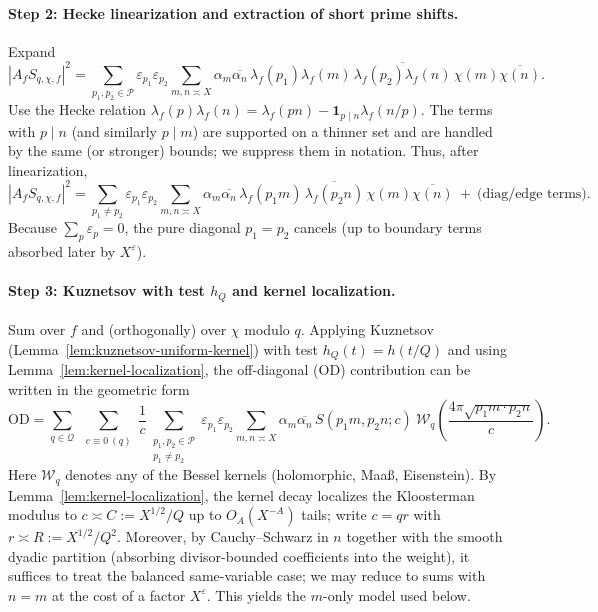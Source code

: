 \documentclass[11pt]{article}
\theoremstyle{definition}
\theoremstyle{remark}
\numberwithin{equation}{part}
\begin{document}
\paragraph{Step 2: Hecke linearization and extraction of short prime shifts.}
Expand
\[
	|A_f S_{q,\chi,f}|^2
	=\sum_{p_1,p_2\in\mathcal P}\varepsilon_{p_1}\varepsilon_{p_2}
	\sum_{m,n\asymp X}\alpha_m\overline{\alpha_n}\,
	\lambda_f(p_1)\lambda_f(m)\,\overline{\lambda_f(p_2)\lambda_f(n)}\,\chi(m)\overline{\chi(n)}.
\]
Use the Hecke relation $\lambda_f(p)\lambda_f(n)=\lambda_f(pn)-\mathbf 1_{p\mid n}\lambda_f(n/p)$.
The terms with $p\mid n$ (and similarly $p\mid m$) are supported on a thinner set and are handled by the same (or stronger) bounds; we suppress them in notation.
Thus, after linearization,
\[
	|A_f S_{q,\chi,f}|^2
	= \sum_{p_1\ne p_2}\varepsilon_{p_1}\varepsilon_{p_2}
	\!\!\sum_{m,n\asymp X}\!\alpha_m\overline{\alpha_n}\,
	\lambda_f(p_1 m)\,\overline{\lambda_f(p_2 n)}\,\chi(m)\overline{\chi(n)}
	\ +\ \text{(diag/edge terms)}.
\]
Because $\sum_{p}\varepsilon_p=0$, the pure diagonal $p_1=p_2$ cancels (up to boundary terms absorbed later by $X^\varepsilon$).

\paragraph{Step 3: Kuznetsov with test $h_Q$ and kernel localization.}
Sum over $f$ and (orthogonally) over $\chi$ modulo $q$.
Applying Kuznetsov (Lemma~\ref{lem:kuznetsov-uniform-kernel}) with test $h_Q(t)=h(t/Q)$ and using Lemma~\ref{lem:kernel-localization},
the off-diagonal (OD) contribution can be written in the geometric form
\[
	\mathrm{OD}
	=\sum_{q\in\mathcal Q}\ \sum_{\substack{c\equiv 0\ (q)}} \frac{1}{c}
	\sum_{\substack{p_1,p_2\in\mathcal P\\ p_1\ne p_2}}\varepsilon_{p_1}\varepsilon_{p_2}
	\sum_{m,n\asymp X}\alpha_m\overline{\alpha_n}\,
	S(p_1 m, p_2 n;c)\ \mathcal W_q\!\left(\frac{4\pi\sqrt{p_1 m\cdot p_2 n}}{c}\right).
\]
Here $\mathcal W_q$ denotes any of the Bessel kernels (holomorphic, Maa\ss, Eisenstein).
By Lemma~\ref{lem:kernel-localization}, the kernel decay localizes the Kloosterman modulus to
$c\asymp C:=X^{1/2}/Q$ up to $O_A(X^{-A})$ tails; write $c=qr$ with $r\asymp R:=X^{1/2}/Q^2$.
Moreover, by Cauchy--Schwarz in $n$ together with the smooth dyadic partition (absorbing divisor-bounded coefficients into the weight), it suffices to treat the balanced same-variable case; we may reduce to sums with $n=m$ at the cost of a factor $X^{\varepsilon}$. This yields the $m$-only model used below.
\end{document}
